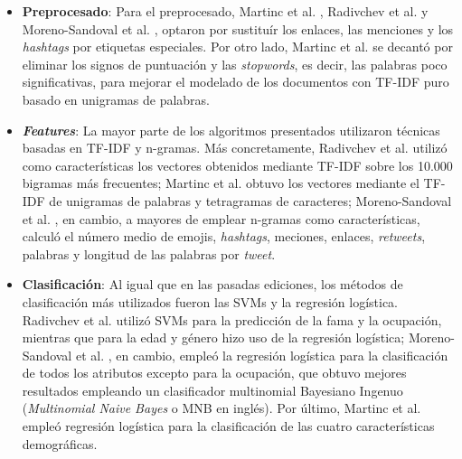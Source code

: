 \begin{itemize}
	\item \textbf{Preprocesado}: Para el preprocesado, Martinc et al. \cite{martinc2019hot}, Radivchev et al. \cite{radivchev2019celebrity}
		y Moreno-Sandoval et al. \cite{moreno2019celebrity}, optaron por sustituír los enlaces,
		las menciones y los \textit{hashtags} por etiquetas especiales. Por otro lado, Martinc et al. \cite{martinc2019hot} se decantó por eliminar los signos de puntuación
		y las \textit{stopwords}, es decir, las palabras poco significativas, para mejorar el modelado de los documentos con TF-IDF puro basado en unigramas de palabras.
	\item \textbf{\textit{Features}}: La mayor parte de los algoritmos presentados utilizaron técnicas basadas en TF-IDF y n-gramas. 
		Más concretamente, Radivchev et al. \cite{radivchev2019celebrity} utilizó como características los vectores obtenidos mediante TF-IDF sobre los 10.000 bigramas más frecuentes;
		Martinc et al. \cite{martinc2019hot} obtuvo los vectores mediante el TF-IDF de unigramas de palabras y tetragramas de caracteres; Moreno-Sandoval et al. \cite{moreno2019celebrity}, en cambio, a mayores
		de emplear n-gramas como características, calculó el número medio de emojis, \textit{hashtags}, meciones, enlaces, \textit{retweets}, palabras y longitud de las
		palabras por \textit{tweet}.
	\item \textbf{Clasificación}: Al igual que en las pasadas ediciones, los métodos de clasificación más utilizados fueron las
		SVMs y la regresión logística. Radivchev et al. \cite{radivchev2019celebrity} utilizó SVMs para la predicción de la fama y la ocupación, mientras que para la edad y género
		hizo uso de la regresión logística; Moreno-Sandoval et al. \cite{moreno2019celebrity}, en cambio, empleó la regresión logística para la clasificación de todos los atributos
		excepto para la ocupación, que obtuvo mejores resultados empleando un clasificador multinomial Bayesiano Ingenuo (\textit{Multinomial Naive Bayes} o MNB en inglés).
		Por último, Martinc et al. \cite{martinc2019hot} empleó regresión logística para la clasificación de las cuatro características demográficas.
\end{itemize}

